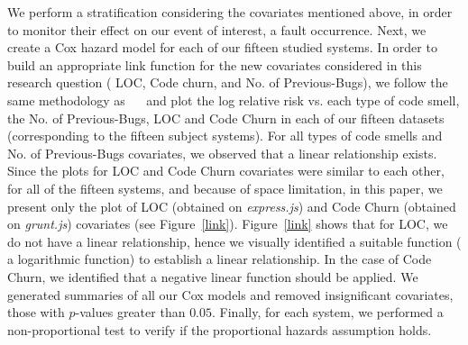 %
We perform a stratification considering the covariates mentioned above, in order to monitor their effect on our event of interest, \ie{} a fault occurrence. Next, we create a Cox hazard model for each of our {\color{blue}fifteen} studied systems. %
In order to build an appropriate link function for the new covariates considered in this research question (\ie{} LOC, Code churn, and No. of Previous-Bugs), we follow the same methodology as ~\cite{koru2008theory}~\cite{selim2010studying} and plot the log relative risk vs. each type of code smell, the No. of Previous-Bugs, LOC and Code Churn in each of our {\color{blue}fifteen} datasets (corresponding to the {\color{blue}fifteen} subject systems). For all types of code smells and No. of Previous-Bugs covariates, we observed that a linear relationship exists. Since the plots for LOC and Code Churn covariates were similar to each other, for all of the {\color{blue}fifteen} systems, and because of space limitation, in this paper, we present only the plot of LOC (obtained on \textsl{express.js}) and Code Churn (obtained on \textsl{grunt.js}) covariates (see Figure~\ref{link}). Figure~\ref{link} shows that for LOC, we do not have a linear relationship, hence we visually identified a suitable function (\ie{} a logarithmic function) to establish a linear relationship. In the case of Code Churn, we identified that a negative linear function should be applied. We generated summaries of all our Cox models and removed insignificant covariates, \ie{} those with $p$-values greater than $0.05$. Finally, for each system, we performed a non-proportional test to verify if the proportional hazards assumption holds. %


